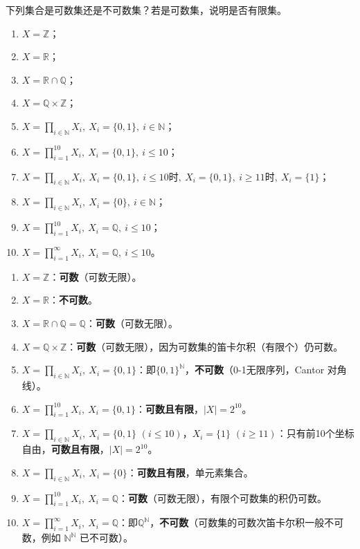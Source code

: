 \begin{homework}[1.18]
下列集合是可数集还是不可数集？若是可数集，说明是否有限集。
\begin{enumerate}[(1)]
  \item $X = \mathbb{Z}$；
  \item $X = \mathbb{R}$；
  \item $X = \mathbb{R}\cap \mathbb{Q}$；
  \item $X = \mathbb{Q}\times \mathbb{Z}$；
  \item $X = \prod_{i\in\mathbb{N}} X_i, \ X_i=\{0,1\},\ i\in\mathbb{N}$；
  \item $X = \prod_{i=1}^{10} X_i, \ X_i=\{0,1\},\ i\leq 10$；
  \item $X = \prod_{i\in\mathbb{N}} X_i, \ X_i=\{0,1\},\ i\leq 10时,\ X_i=\{0,1\},\ i\geq 11时,\ X_i=\{1\}$；
  \item $X = \prod_{i\in\mathbb{N}} X_i, \ X_i=\{0\},\ i\in\mathbb{N}$；
  \item $X = \prod_{i=1}^{10} X_i, \ X_i=\mathbb{Q},\ i\leq 10$；
  \item $X = \prod_{i=1}^{\infty} X_i, \ X_i=\mathbb{Q},\ i\leq 10$。
\end{enumerate}
\end{homework}

\begin{solution}
\begin{enumerate}[(1)]
  \item $X=\mathbb Z$：\textbf{可数}（可数无限）。
  \item $X=\mathbb R$：\textbf{不可数}。
  \item $X=\mathbb R\cap\mathbb Q=\mathbb Q$：\textbf{可数}（可数无限）。
  \item $X=\mathbb Q\times\mathbb Z$：\textbf{可数}（可数无限），因为可数集的笛卡尔积（有限个）仍可数。
  \item $X=\prod_{i\in\mathbb N}X_i,\ X_i=\{0,1\}$：即$\{0,1\}^{\mathbb N}$，\textbf{不可数}（0-1无限序列，Cantor 对角线）。
  \item $X=\prod_{i=1}^{10}X_i,\ X_i=\{0,1\}$：\textbf{可数且有限}，$|X|=2^{10}$。
  \item $X=\prod_{i\in\mathbb N}X_i,\ X_i=\{0,1\}$ $(i\le 10)$，$X_i=\{1\}$ $(i\ge 11)$：只有前10个坐标自由，\textbf{可数且有限}，$|X|=2^{10}$。
  \item $X=\prod_{i\in\mathbb N}X_i,\ X_i=\{0\}$：\textbf{可数且有限}，单元素集合。
  \item $X=\prod_{i=1}^{10}X_i,\ X_i=\mathbb Q$：\textbf{可数}（可数无限），有限个可数集的积仍可数。
  \item $X=\prod_{i=1}^{\infty}X_i,\ X_i=\mathbb Q$：即$\mathbb Q^{\mathbb N}$，\textbf{不可数}（可数集的可数次笛卡尔积一般不可数，例如 $\mathbb N^{\mathbb N}$ 已不可数）。
\end{enumerate}
\end{solution}

